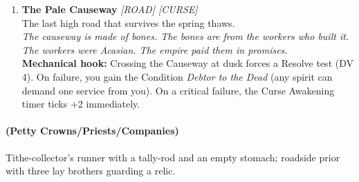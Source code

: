 \begin{enumerate}
\item \textbf{The Pale Causeway} \hfill {} \textit{[ROAD] [CURSE]} \\
  The last high road that survives the spring thaws. \\
  \textit{The causeway is made of bones. The bones are from the workers who built it. The workers were Acasian. The empire paid them in promises.} \\
  \textbf{Mechanical hook:} Crossing the Causeway at dusk forces a Resolve test (DV 4). On failure, you gain the Condition \textit{Debtor to the Dead} (any spirit can demand one service from you). On a critical failure, the Curse Awakening timer ticks +2 immediately.
\end{enumerate}

\paragraph*{(Petty Crowns/Priests/Companies)} Tithe-collector's runner with a tally-rod and an empty stomach; roadside prior with three lay brothers guarding a relic.

